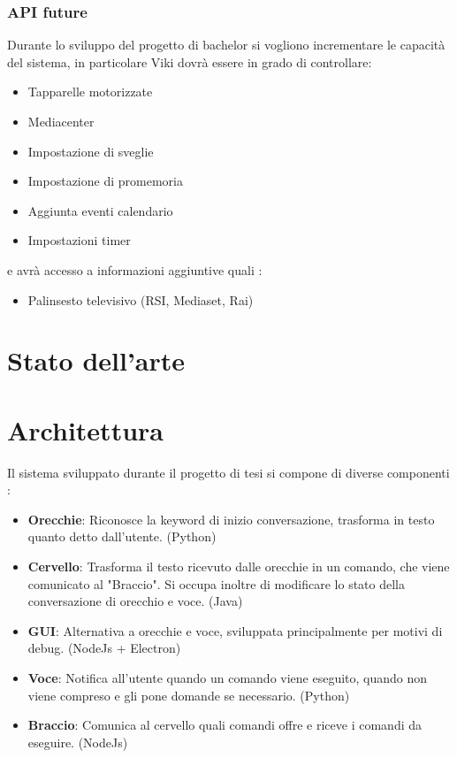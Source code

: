 \documentclass[twoside]{supsistudent}
\begin{document}
\subsection{API future}
Durante lo sviluppo del progetto di bachelor si vogliono incrementare le capacità del sistema, in particolare Viki dovrà essere in grado di controllare:
\begin{itemize}
  \item Tapparelle motorizzate
  \item Mediacenter
  \item Impostazione di sveglie
  \item Impostazione di promemoria
  \item Aggiunta eventi calendario
  \item Impostazioni timer
\end{itemize}
e avrà accesso a informazioni aggiuntive quali :
\begin{itemize}
  \item Palinsesto televisivo (RSI, Mediaset, Rai)
\end{itemize}

\chapter{Stato dell'arte}

\chapter{Architettura}

Il sistema sviluppato durante il progetto di tesi si compone di diverse componenti :
\begin{itemize}
	\item \textbf{Orecchie}: Riconosce la keyword di inizio conversazione, trasforma in testo quanto detto dall'utente. (Python)
	\item \textbf{Cervello}: Trasforma il testo ricevuto dalle orecchie in un comando, che viene comunicato al "Braccio". Si occupa inoltre di modificare lo stato della conversazione di orecchio e voce. (Java)
	\item \textbf{GUI}: Alternativa a orecchie e voce, sviluppata principalmente per motivi di debug. (NodeJs + Electron)
	\item \textbf{Voce}: Notifica all'utente quando un comando viene eseguito, quando non viene compreso e gli pone domande se necessario. (Python)
	\item \textbf{Braccio}: Comunica al cervello quali comandi offre e riceve i comandi da eseguire. (NodeJs)
\end{itemize}
\end{document}
